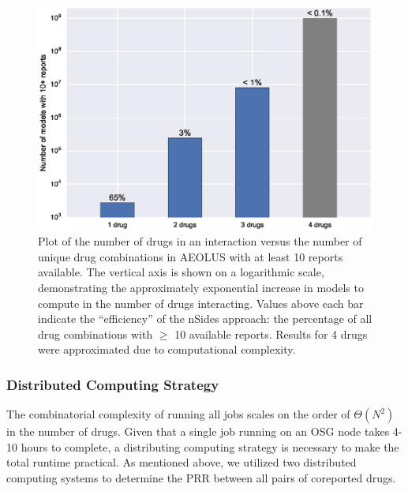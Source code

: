 \documentclass{ws-procs11x85}
\begin{document}
\begin{figure}[h]
\centerline{\includegraphics[width=5in, scale=0.7]{drug_interactions}}
\caption{Plot of the number of drugs in an interaction versus the
  number of unique drug combinations in AEOLUS with at least 10
  reports available. The vertical axis is shown on a logarithmic
  scale, demonstrating the approximately exponential increase in
  models to compute in the number of drugs interacting. Values above
  each bar indicate the ``efficiency'' of the nSides approach: the
  percentage of all drug combinations with $\geq$ 10 available
  reports. Results for 4 drugs were approximated due to computational
  complexity.}
\label{fig:drug_interactions}
\end{figure}

\subsubsection{Distributed Computing Strategy}
The combinatorial complexity of running all jobs scales on the order
of $\Theta(N^2)$ in the number of drugs. Given that a single job
running on an OSG node takes 4-10 hours to complete, a distributing
computing strategy is necessary to make the total runtime
practical. As mentioned above, we utilized two distributed computing systems to determine
the PRR between all pairs of coreported drugs.
\end{document}
